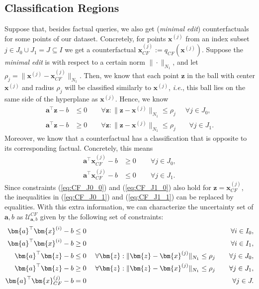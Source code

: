 \documentclass{article}
\begin{document}
\subsection{Classification Regions}\label{sec:regions_CF}
Suppose that, besides factual queries, we also get (\textit{minimal edit}) counterfactuals for some points of our dataset. Concretely, for points $\bm{x}^{(j)}$ from an index subset $j\in J_{0}\cup J_1=J\subseteq I$ we get a counterfactual $\bm{x}_{CF}^{(j)}:=q_{CF}(\bm{x}^{(j)})$. Suppose the \textit{minimal edit} is with respect to a certain norm $\| \cdot\|_{N_1}$, and let $\rho_j = \| \bm{x}^{(j)} - \bm{x}_{CF}^{(j)}\|_{N_1}$. Then, we know that each point $\bm{z}$ in the ball with center $\bm{x}^{(j)}$ and radius $\rho_j$ will be classified similarly to $\bm{x}^{(j)}$, \textit{i.e.}, this ball lies on the same side of the hyperplane as $\bm{x}^{(j)}$. Hence, we know 
\begin{align}
    \bm{a}^{\top}\bm{z} -b&\leq 0  \qquad \forall \bm{z} : \| \bm{z} - \bm{x}^{(j)}\|_{N_1} \leq \rho_j \; \; &\forall j \in J_{0},\label{eq:CF_J0_0}\\
    \bm{a}^{\top}\bm{z} -b &\geq 0   \qquad 
  \forall \bm{z} : \| \bm{z} - \bm{x}^{(j)}\|_{N_1} \leq \rho_j&\; \; \forall j \in J_1.\label{eq:CF_J1_0}
\end{align}
Moreover, we know that a counterfactual has a classification that is opposite to its corresponding factual. Concretely, this means
\begin{align}
  \bm{a}^{\top}\bm{x}_{CF}^{(j)} -b &\geq 0  &\quad \forall j \in J_{0},  \label{eq:CF_J0_1} \\
  \bm{a}^{\top}\bm{x}_{CF}^{(j)} -b&\leq 0 \;  &\quad \forall j \in J_1.
  \label{eq:CF_J1_1}
\end{align}
Since constraints (\ref{eq:CF_J0_0}) and (\ref{eq:CF_J1_0}) also hold for $\bm{z}=\bm{x}_{CF}^{(j)}$, the inequalities in (\ref{eq:CF_J0_1}) and (\ref{eq:CF_J1_1}) can be replaced by equalities. With this extra information, we can characterize the uncertainty set of $\bm{a},b$ as $\mathcal{U}_{\bm{a},b}^{CF}$ given by the following set of constraints:
\begin{align*}
  \bm{a}^{\top}\bm{x}^{(i)} -b&\leq 0  &\quad \forall i \in I_{0},  \notag\\
  \bm{a}^{\top}\bm{x}^{(i)} -b&\geq 0  &\quad \forall i \in I_1, \notag\\
  \bm{a}^{\top}\bm{z} -b&\leq 0  \;\quad \forall \bm{z} : \| \bm{z} - \bm{x}^{(j)}\|_{N_1} \leq \rho_j  &\quad\forall j \in J_{0}, \\ 
  \bm{a}^{\top}\bm{z} -b &\geq 0 \;  \quad 
  \forall \bm{z} : \| \bm{z} - \bm{x}^{(j)}\|_{N_1} \leq \rho_j&\quad \forall j \in J_1, \\
  \bm{a}^{\top}\bm{x}_{CF}^{(j)} -b&= 0   &\quad \forall j \in J.
\end{align*}
\end{document}
